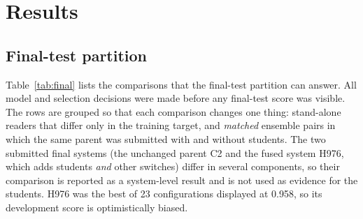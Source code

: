 \documentclass{ieeeaccess}
\begin{document}
\section{Results}
\label{sec:results}

\subsection{Final-test partition}
\label{sec:res-final}
Table~\ref{tab:final} lists the comparisons that the final-test partition can answer. All model and selection decisions
were made before any final-test score was visible. The rows are grouped so that each comparison changes one thing:
stand-alone readers that differ only in the training target, and \emph{matched} ensemble pairs in which the same parent
was submitted with and without students. The two submitted final systems (the unchanged parent C2 and the fused system
H976, which adds students \emph{and} other switches) differ in several components, so their comparison is reported as a
system-level result and is not used as evidence for the students. H976 was the best of 23 configurations displayed at
0.958, so its development score is optimistically biased.
\end{document}
